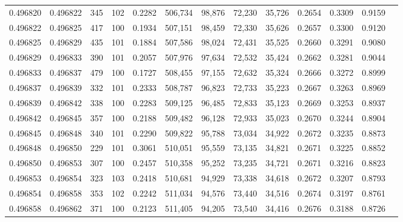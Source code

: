 \begin{tabular}{rrrrrrrrrrrrr}
0.496820 & 0.496822 &   345 & 102 &                                     0.2282 & 506,734 &  98,876 &  72,230 &  35,726 & 0.2654 & 0.3309 & 0.9159 \\
0.496822 & 0.496825 &   417 & 100 &                                     0.1934 & 507,151 &  98,459 &  72,330 &  35,626 & 0.2657 & 0.3300 & 0.9120 \\
0.496825 & 0.496829 &   435 & 101 &                                     0.1884 & 507,586 &  98,024 &  72,431 &  35,525 & 0.2660 & 0.3291 & 0.9080 \\
0.496829 & 0.496833 &   390 & 101 &                                     0.2057 & 507,976 &  97,634 &  72,532 &  35,424 & 0.2662 & 0.3281 & 0.9044 \\
0.496833 & 0.496837 &   479 & 100 &                                     0.1727 & 508,455 &  97,155 &  72,632 &  35,324 & 0.2666 & 0.3272 & 0.8999 \\
0.496837 & 0.496839 &   332 & 101 &                                     0.2333 & 508,787 &  96,823 &  72,733 &  35,223 & 0.2667 & 0.3263 & 0.8969 \\
0.496839 & 0.496842 &   338 & 100 &                                     0.2283 & 509,125 &  96,485 &  72,833 &  35,123 & 0.2669 & 0.3253 & 0.8937 \\
0.496842 & 0.496845 &   357 & 100 &                                     0.2188 & 509,482 &  96,128 &  72,933 &  35,023 & 0.2670 & 0.3244 & 0.8904 \\
0.496845 & 0.496848 &   340 & 101 &                                     0.2290 & 509,822 &  95,788 &  73,034 &  34,922 & 0.2672 & 0.3235 & 0.8873 \\
0.496848 & 0.496850 &   229 & 101 &                                     0.3061 & 510,051 &  95,559 &  73,135 &  34,821 & 0.2671 & 0.3225 & 0.8852 \\
0.496850 & 0.496853 &   307 & 100 &                                     0.2457 & 510,358 &  95,252 &  73,235 &  34,721 & 0.2671 & 0.3216 & 0.8823 \\
0.496853 & 0.496854 &   323 & 103 &                                     0.2418 & 510,681 &  94,929 &  73,338 &  34,618 & 0.2672 & 0.3207 & 0.8793 \\
0.496854 & 0.496858 &   353 & 102 &                                     0.2242 & 511,034 &  94,576 &  73,440 &  34,516 & 0.2674 & 0.3197 & 0.8761 \\
0.496858 & 0.496862 &   371 & 100 &                                     0.2123 & 511,405 &  94,205 &  73,540 &  34,416 & 0.2676 & 0.3188 & 0.8726 \\

\end{tabular}
